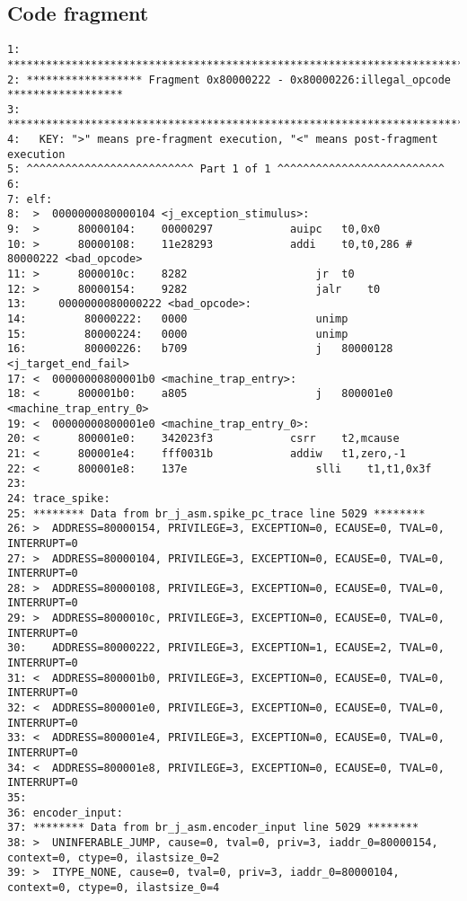 \subsection{Code fragment}
\begin {lstlisting}[basicstyle=\tiny]
1: *************************************************************************************
2: ****************** Fragment 0x80000222 - 0x80000226:illegal_opcode ******************
3: *************************************************************************************
4:   KEY: ">" means pre-fragment execution, "<" means post-fragment execution
5: ^^^^^^^^^^^^^^^^^^^^^^^^^^ Part 1 of 1 ^^^^^^^^^^^^^^^^^^^^^^^^^^
6:
7: elf:
8:  >  0000000080000104 <j_exception_stimulus>:
9:  >      80000104:	00000297          	auipc	t0,0x0
10: >      80000108:	11e28293          	addi	t0,t0,286 # 80000222 <bad_opcode>
11: >      8000010c:	8282                	jr	t0
12: >      80000154:	9282                	jalr	t0
13:     0000000080000222 <bad_opcode>:
14:         80000222:	0000                	unimp
15:         80000224:	0000                	unimp
16:         80000226:	b709                	j	80000128 <j_target_end_fail>
17: <  00000000800001b0 <machine_trap_entry>:
18: <      800001b0:	a805                	j	800001e0 <machine_trap_entry_0>
19: <  00000000800001e0 <machine_trap_entry_0>:
20: <      800001e0:	342023f3          	csrr	t2,mcause
21: <      800001e4:	fff0031b          	addiw	t1,zero,-1
22: <      800001e8:	137e                	slli	t1,t1,0x3f
23:
24: trace_spike:
25: ******** Data from br_j_asm.spike_pc_trace line 5029 ********
26: >  ADDRESS=80000154, PRIVILEGE=3, EXCEPTION=0, ECAUSE=0, TVAL=0, INTERRUPT=0
27: >  ADDRESS=80000104, PRIVILEGE=3, EXCEPTION=0, ECAUSE=0, TVAL=0, INTERRUPT=0
28: >  ADDRESS=80000108, PRIVILEGE=3, EXCEPTION=0, ECAUSE=0, TVAL=0, INTERRUPT=0
29: >  ADDRESS=8000010c, PRIVILEGE=3, EXCEPTION=0, ECAUSE=0, TVAL=0, INTERRUPT=0
30:    ADDRESS=80000222, PRIVILEGE=3, EXCEPTION=1, ECAUSE=2, TVAL=0, INTERRUPT=0
31: <  ADDRESS=800001b0, PRIVILEGE=3, EXCEPTION=0, ECAUSE=0, TVAL=0, INTERRUPT=0
32: <  ADDRESS=800001e0, PRIVILEGE=3, EXCEPTION=0, ECAUSE=0, TVAL=0, INTERRUPT=0
33: <  ADDRESS=800001e4, PRIVILEGE=3, EXCEPTION=0, ECAUSE=0, TVAL=0, INTERRUPT=0
34: <  ADDRESS=800001e8, PRIVILEGE=3, EXCEPTION=0, ECAUSE=0, TVAL=0, INTERRUPT=0
35:
36: encoder_input:
37: ******** Data from br_j_asm.encoder_input line 5029 ********
38: >  UNINFERABLE_JUMP, cause=0, tval=0, priv=3, iaddr_0=80000154, context=0, ctype=0, ilastsize_0=2
39: >  ITYPE_NONE, cause=0, tval=0, priv=3, iaddr_0=80000104, context=0, ctype=0, ilastsize_0=4

\end{lstlisting}
